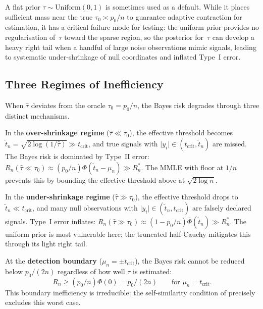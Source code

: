 \documentclass[12pt]{article}
\newcommand{\abs}[1]{\lvert #1 \rvert}
\newcommand{\tcrit}{t_{\mathrm{crit}}}
\begin{document}
A flat prior $\tau \sim \mathrm{Uniform}(0,1)$ is sometimes used as a default. While it places sufficient mass near the true $\tau_0 \asymp p_0/n$ to guarantee adaptive contraction for estimation, it has a critical failure mode for testing: the uniform prior provides no regularisation of~$\tau$ toward the sparse region, so the posterior for~$\tau$ can develop a heavy right tail when a handful of large noise observations mimic signals, leading to systematic under-shrinkage of null coordinates and inflated Type~I error.

\subsection{Three Regimes of Inefficiency}\label{sec:regimes}

When $\hat{\tau}$ deviates from the oracle $\tau_0 = p_0/n$, the Bayes risk degrades through three distinct mechanisms.

In the \textbf{over-shrinkage regime} ($\hat{\tau} \ll \tau_0$), the effective threshold becomes $\tilde{t}_n = \sqrt{2\log(1/\hat{\tau})} \gg \tcrit$, and true signals with $\abs{y_i} \in (\tcrit, \tilde{t}_n)$ are missed. The Bayes risk is dominated by Type~II error: $R_n(\hat{\tau} \ll \tau_0) \approx (p_0/n)\Phi(\tilde{t}_n - \mu_n) \gg R_n^*$. The MMLE with floor at $1/n$ prevents this by bounding the effective threshold above at $\sqrt{2\log n}$.

In the \textbf{under-shrinkage regime} ($\hat{\tau} \gg \tau_0$), the effective threshold drops to $\tilde{t}_n \ll \tcrit$, and many null observations with $\abs{y_i} \in (\tilde{t}_n, \tcrit)$ are falsely declared signals. Type~I error inflates: $R_n(\hat{\tau} \gg \tau_0) \approx (1 - p_0/n)\bar{\Phi}(\tilde{t}_n) \gg R_n^*$. The uniform prior is most vulnerable here; the truncated half-Cauchy mitigates this through its light right tail.

At the \textbf{detection boundary} ($\mu_n = \pm\tcrit$), the Bayes risk cannot be reduced below $p_0/(2n)$ regardless of how well $\tau$ is estimated:
\begin{equation}\label{eq:boundary-risk}
  R_n \geq (p_0/n)\Phi(0) = p_0/(2n) \qquad\text{for } \mu_n = \tcrit.
\end{equation}
This boundary inefficiency is irreducible: the self-similarity condition of \citet{vanderpas2017uncertainty} precisely excludes this worst case.
\end{document}

